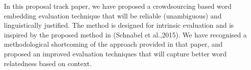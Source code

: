 In this proposal track paper, we have proposed a crowdsourcing based word embedding evaluation technique that will be reliable (unambiguous) and linguistically justified. The method is designed for intrinsic evaluation and is inspired by the proposed method in (Schnabel et al.,2015). We have recognised a methodological shortcoming of the approach provided in that paper, and proposed an improved evaluation techniques that will capture better word relatedness based on context.
